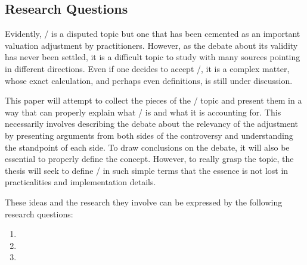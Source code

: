 \documentclass[main.tex]{subfiles}
\begin{document}
    \subsection{Research Questions}
        
    Evidently, \FVA/ is a disputed topic 
    but one that has been cemented as an important valuation adjustment by practitioners.
    However, as the debate about its validity has never been settled,
    it is a difficult topic to study with many sources pointing in different directions.
    Even if one decides to accept \FVA/, it is a complex matter,
    whose exact calculation, and perhaps even definitions, is still under discussion.

    This paper will attempt to collect the pieces of the \FVA/ topic
    and present them in a way that can properly explain what \FVA/ is and what it is accounting for.
    This necessarily involves describing the debate about the relevancy of the adjustment
    by presenting arguments from both sides of the controversy 
    and understanding the standpoint of each side.
    To draw conclusions on the debate, it will also be essential to properly define the concept.
    However, to really grasp the topic, the thesis will seek to define \FVA/ in such simple terms 
    that the essence is not lost in practicalities and implementation details.

    These ideas and the research they involve can be expressed by the following research questions:
    \begin{enumerate}
        \item \researchQuestionFundingCosts
        \item \researchQuestionFvaDebate
        \item \researchQuestionFvaImplications
    \end{enumerate}
\end{document}
